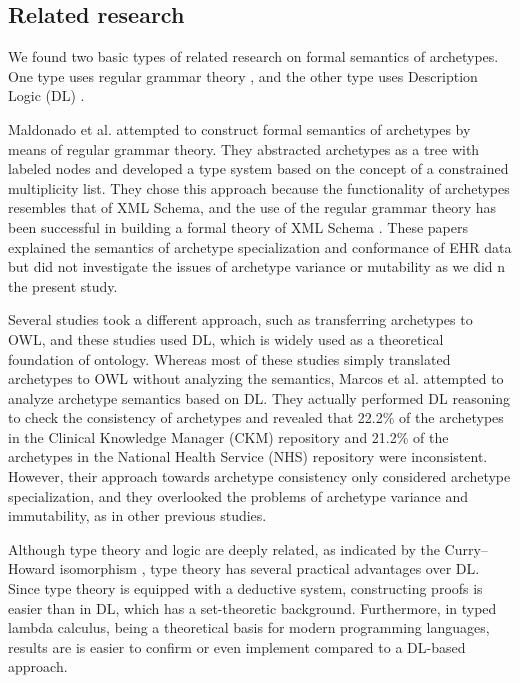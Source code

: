 \documentclass[preprint,3p,onecolumn,times,review]{elsarticle}
\begin{document}
\subsection{Related research}

We found two basic types of related research on formal semantics of archetypes. One type uses regular grammar theory \cite{jose09:_linkeh_ed,maldonado07:_framew_for_clinic_data_stand_based_archet}, and the other type uses Description Logic (DL) \cite{martinez-costa08:_model_driven_approac_for_repres,maldonado12:_using_resear_ehr,lezcano11:_integ_owl_swrl,martinez-costa10:_iso_en_openeh,costa12:_towar}.

Maldonado et al. \cite{jose09:_linkeh_ed,maldonado07:_framew_for_clinic_data_stand_based_archet} attempted to construct formal semantics of archetypes by means of regular grammar theory.  They abstracted archetypes as a tree with labeled nodes and developed a type system based on the concept of a constrained multiplicity list. They chose this approach because the functionality of archetypes resembles that of XML Schema, and the use of the regular grammar theory has been successful in building a formal theory of XML Schema \cite{chidlovskii00:_using_regul_tree_autom_xml,murata05:_taxon_of_xml_schem_languag}. These papers explained the semantics of archetype specialization and conformance of EHR data but did not investigate the issues of archetype variance or mutability as we did n the present study.

Several studies took a different approach, such as transferring archetypes to OWL, and these studies used DL, which is widely used as a theoretical foundation of ontology. Whereas most of these studies \cite{martinez-costa08:_model_driven_approac_for_repres,maldonado12:_using_resear_ehr,lezcano11:_integ_owl_swrl,martinez-costa10:_iso_en_openeh,costa12:_towar} simply translated archetypes to OWL without analyzing the semantics, Marcos et al. \cite{menarguez-tortosa13:_owl} attempted to analyze archetype semantics based on DL. They actually performed DL reasoning to check the consistency of archetypes and revealed that 22.2\% of the archetypes in the Clinical Knowledge Manager (CKM) repository and 21.2\% of the archetypes in the National Health Service (NHS) repository were inconsistent. However, their approach towards archetype consistency only considered archetype specialization, and they overlooked the problems of archetype variance and immutability, as in other previous studies.


Although type theory and logic are deeply related, as indicated by the Curry--Howard isomorphism \cite{lawler08:_class_logic_curry_howar_corres,sorensen98:_lectur_curry_howar_isomor}, type theory has several practical advantages over DL.
Since type theory is equipped with a deductive system, constructing proofs is easier than in DL, which has a set-theoretic background.
Furthermore, in typed lambda calculus, being a theoretical basis for modern programming languages, results are is easier to confirm or even implement compared to a DL-based approach.
\end{document}
